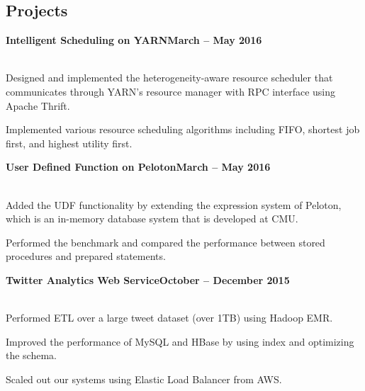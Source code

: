 \documentclass[10pt,margin,line]{resume}
\begin{document}
\begin{resume}
\section{\mysidestyle Projects}
\textbf{Intelligent Scheduling on YARN}\hfill \textbf{March -- May 2016} \vspace{0mm}\\\vspace{0mm}%
\vspace{-7mm}\\\vspace{-1mm}%
\begin{list3}
    \item Designed and implemented the heterogeneity-aware resource scheduler that communicates through YARN's resource manager with RPC interface using Apache Thrift.
    \item Implemented various resource scheduling algorithms including FIFO, shortest job first, and highest utility first.
\end{list3}

\textbf{User Defined Function on Peloton}\hfill \textbf{March -- May 2016} \vspace{0mm}\\\vspace{0mm}%
\vspace{-7mm}\\\vspace{-1mm}%
\begin{list3}
    \item Added the UDF functionality by extending the expression system of Peloton, which is an in-memory database system that is developed at CMU.
    \item Performed the benchmark and compared the performance between stored procedures and prepared statements.
\end{list3}

\textbf{Twitter Analytics Web Service}\hfill \textbf{October -- December 2015} \vspace{0mm}\\\vspace{0mm}\vspace{-7mm}\\\vspace{-1mm}%
\begin{list3}
    \item Performed ETL over a large tweet dataset (over 1TB) using Hadoop EMR.
    \item Improved the performance of MySQL and HBase by using index and optimizing the schema.
    \item Scaled out our systems using Elastic Load Balancer from AWS.
\end{list3}


\end{resume}
\end{document}
